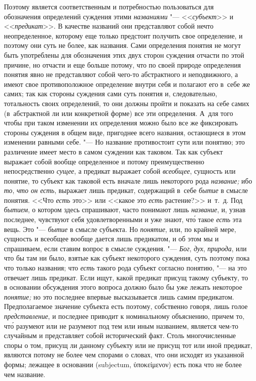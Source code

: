 Поэтому является соответственным и потребностью пользоваться
для обозначения определений суждения этими
{\em названиями} "--- <<{\em субъект}>> и <<{\em предикат}>>.
В качестве названий они представляют собой нечто
неопределенное, которому еще только предстоит получить свое определение, и
поэтому они суть не более, как названия. Сами определения понятия не могут
быть употреблены для обозначения этих двух сторон суждения отчасти по этой
причине, но отчасти и еще больше потому, что по своей природе определения
понятия явно не представляют собой чего-то абстрактного и неподвижного, а
имеют свое противоположное определение внутри себя и полагают его в~себе же
самих; так как стороны суждения сами суть понятия и,
следовательно, тотальность своих определений, то они должны пройти и
показать на себе самих (в~абстрактной ли или конкретной форме) все эти
определения. А~для того чтобы при таком изменении их определения можно было
все же фиксировать стороны суждения в общем виде, пригоднее всего названия,
остающиеся в этом изменении равными себе. "--- Но название
противостоит сути или понятию; это различение имеет место в самом суждении
как таковом. Так как субъект выражает собой вообще определенное и потому
преимущественно непосредственно {\em сущее}, а предикат
выражает собой {\em всеобщее},
сущность или понятие, то субъект как таковой есть вначале
лишь некоторого рода {\em название;} ибо {\em то}, {\em что он есть},
выражает лишь предикат, содержащий в~себе {\em бытие} в смысле
понятия. <<Что {\em есть} это>> или <<какое это {\em есть} растение?>>
и~т.~д. Под {\em бытием},
о котором здесь спрашивают, часто понимают лишь {\em название}, и, узнав
последнее, чувствуют себя удовлетворенными и уже знают, чт\'{о} такое
{\em есть} эта вещь. Это "--- {\em бытие} в смысле субъекта. Но
{\em понятие},
или, по крайней мере, сущность и всеобщее вообще дается лишь
предикатом, и об этом мы и спрашиваем, если ставим вопрос в смысле
суждения. "--- {\em Бог}, {\em дух}, {\em природа}, или что бы
там ни было, взятые как субъект некоторого суждения, суть поэтому пока что
только названия; что {\em есть} такого рода субъект согласно понятию, "--- на
это отвечает лишь предикат. Если ищут, какой предикат присущ такому субъекту,
то в основании обсуждения этого вопроса должно было бы уже лежать некоторое
{\em понятие;} но это последнее впервые высказывается лишь
самим предикатом. Предполагаемое значение субъекта есть
поэтому, собственно говоря, лишь голое {\em представление},
и последнее приводит к номинальному объяснению, причем то, чт\'{о} разумеют
или не разумеют под тем или иным названием, является чем-то случайным и
представляет собой исторический факт. Столь многочисленные споры о том,
присущ ли данному субъекту или не присущ тот или иной предикат, являются
потому не более чем спорами о словах, что они исходят из указанной формы;
лежащее в основании (subjectum, \textgreek{ὑποκείμενον}) есть пока
что не более чем название.

